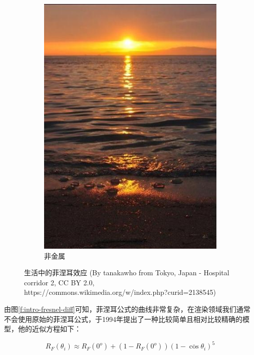 \begin{figure}
\begin{subfigure}[b]{0.5\textwidth}
		\includegraphics[width=1.\textwidth]{figures/intro/fresnel-4}
		\caption{非金属}
	\end{subfigure}
	\caption{生活中的菲涅耳效应 (By tanakawho from Tokyo, Japan - Hospital corridor 2, CC BY 2.0, https://commons.wikimedia.org/w/index.php?curid=2138545)}
\label{f:intro-fresnel-diff-1}
\end{figure}

由图\ref{f:intro-fresnel-diff}可知，菲涅耳公式的曲线非常复杂，在渲染领域我们通常不会使用原始的菲涅耳公式，\cite{a:AnInexpensiveBRDFModelforPhysically-BasedRendering}于1994年提出了一种比较简单且相对比较精确的模型，他的近似方程如下：

\begin{equation}
	R_F(\theta_i)\approx R_F(0^o)+(1-R_F(0^o))(1-\overline{\cos}\theta_i)^5
\end{equation}


